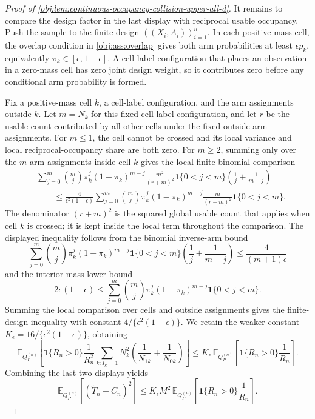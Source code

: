\documentclass[11pt]{article}
\begin{document}
\begin{proof}[Proof of \cref{obj:lem:continuous-occupancy-collision-upper-all-d}]
It remains to compare the design factor in the last display with reciprocal usable occupancy.  Push the sample to the finite design \(((X_i,A_i))_{i=1}^n\).  In each positive-mass cell, the overlap condition in \cref{obj:ass:overlap} gives both arm probabilities at least \(\epsilon p_k\), equivalently \(\pi_k\in[\epsilon,1-\epsilon]\).  A cell-label configuration that places an observation in a zero-mass cell has zero joint design weight, so it contributes zero before any conditional arm probability is formed.

Fix a positive-mass cell \(k\), a cell-label configuration, and the arm assignments outside \(k\).  Let \(m=N_k\) for this fixed cell-label configuration, and let \(r\) be the usable count contributed by all other cells under the fixed outside arm assignments.  For \(m\le1\), the cell cannot be crossed and its local variance and local reciprocal-occupancy share are both zero.  For \(m\ge2\), summing only over the \(m\) arm assignments inside cell \(k\) gives the local finite-binomial comparison
\[
\begin{aligned}
&\sum_{j=0}^{m}\binom{m}{j}\pi_k^j(1-\pi_k)^{m-j}
\frac{m^2}{(r+m)^2}
\mathbf 1\{0<j<m\}
\left(\frac1j+\frac1{m-j}\right) \\
&\qquad\le
\frac{4}{\epsilon^2(1-\epsilon)}
\sum_{j=0}^{m}\binom{m}{j}\pi_k^j(1-\pi_k)^{m-j}
\frac{m}{(r+m)^2}
\mathbf 1\{0<j<m\}.
\end{aligned}
\]
The denominator \((r+m)^2\) is the squared global usable count that applies when cell \(k\) is crossed; it is kept inside the local term throughout the comparison.  The displayed inequality follows from the binomial inverse-arm bound
\[
\sum_{j=0}^{m}\binom{m}{j}\pi_k^j(1-\pi_k)^{m-j}
\mathbf 1\{0<j<m\}
\left(\frac1j+\frac1{m-j}\right)
\le
\frac{4}{(m+1)\epsilon}
\]
and the interior-mass lower bound
\[
2\epsilon(1-\epsilon)
\le
\sum_{j=0}^{m}\binom{m}{j}\pi_k^j(1-\pi_k)^{m-j}
\mathbf 1\{0<j<m\}.
\]
Summing the local comparison over cells and outside assignments gives the finite-design inequality with constant \(4/\{\epsilon^2(1-\epsilon)\}\).  We retain the weaker constant \(K_\epsilon=16/\{\epsilon^2(1-\epsilon)\}\), obtaining
\[
\mathbb E_{Q_P^{(n)}}\!\left[
\mathbf 1\{R_n>0\}\frac1{R_n^2}
\sum_{k:I_k=1}N_k^2
\left(\frac1{N_{1k}}+\frac1{N_{0k}}\right)
\right]
\le
K_\epsilon\,
\mathbb E_{Q_P^{(n)}}\!\left[
\mathbf 1\{R_n>0\}\frac1{R_n}
\right].
\]
Combining the last two displays yields
\[
\mathbb E_{Q_P^{(n)}}\!\left[(\widetilde T_n-C_n)^2\right]
\le
K_\epsilon M^2\,
\mathbb E_{Q_P^{(n)}}\!\left[
\mathbf 1\{R_n>0\}\frac1{R_n}
\right].
\]


\end{proof}
\end{document}
